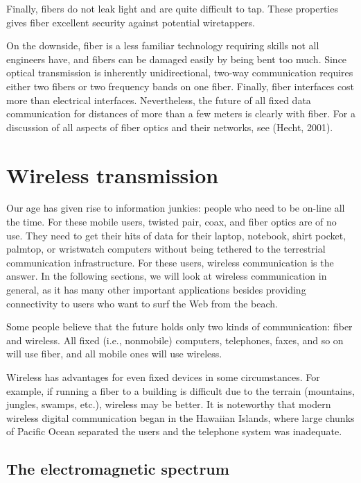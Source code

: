 \documentclass[b5paper,11pt]{memoir}
\begin{document}
Finally, fibers do not leak light and are quite difficult to tap. These
properties gives fiber excellent security against potential wiretappers.

On the downside, fiber is a less familiar technology requiring skills
not all engineers have, and fibers can be damaged easily by being bent
too much. Since optical transmission is inherently unidirectional,
two-way communication requires either two fibers or two frequency bands
on one fiber. Finally, fiber interfaces cost more than electrical
interfaces. Nevertheless, the future of all fixed data communication for
distances of more than a few meters is clearly with fiber. For a
discussion of all aspects of fiber optics and their networks, see
(Hecht, 2001).


\section{Wireless transmission}

Our age has given rise to information junkies: people who need to be
on-line all the time. For these mobile users, twisted pair, coax, and
fiber optics are of no use. They need to get their hits of data for
their laptop, notebook, shirt pocket, palmtop, or wristwatch computers
without being tethered to the terrestrial communication infrastructure.
For these users, wireless communication is the answer. In the following
sections, we will look at wireless communication in general, as it has
many other important applications besides providing connectivity to
users who want to surf the Web from the beach.

Some people believe that the future holds only two kinds of
communication: fiber and wireless. All fixed (i.e., nonmobile)
computers, telephones, faxes, and so on will use fiber, and all mobile
ones will use wireless.

Wireless has advantages for even fixed devices in some circumstances.
For example, if running a fiber to a building is difficult due to the
terrain (mountains, jungles, swamps, etc.), wireless may be better. It
is noteworthy that modern wireless digital communication began in the
Hawaiian Islands, where large chunks of Pacific Ocean separated the
users and the telephone system was inadequate.

\subsection{The electromagnetic spectrum}
\end{document}
